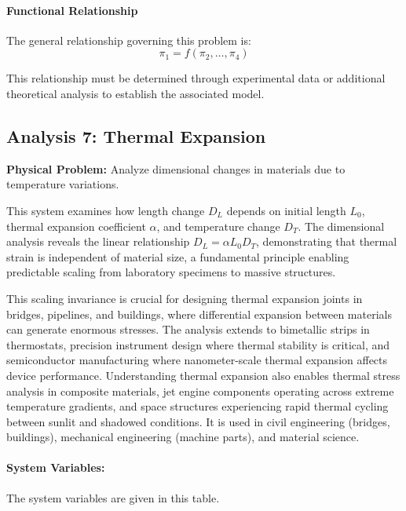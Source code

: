                     \paragraph{Functional Relationship}
                    The general relationship governing this problem is:
                    \begin{equation}
                    \pi_1 = f(\pi_2, \ldots, \pi_{4})
                    \end{equation}

                    This relationship must be determined through experimental data or additional theoretical analysis to establish the associated model.


\subsection{Analysis 7: Thermal Expansion}
\label{sec:Thermal_Expansion}

\begin{problembox}
\textbf{Physical Problem:} Analyze dimensional changes in materials due to temperature variations.
\end{problembox}

This system examines how length change $D_L$ depends on initial length $L_0$, thermal expansion coefficient $\alpha$, and temperature change $D_T$. The dimensional analysis reveals the linear relationship $D_L = \alpha L_0 D_T$, demonstrating that thermal strain is independent of material size, a fundamental principle enabling predictable scaling from laboratory specimens to massive structures.



This scaling invariance is crucial for designing thermal expansion joints in bridges, pipelines, and buildings, where differential expansion between materials can generate enormous stresses. The analysis extends to bimetallic strips in thermostats, precision instrument design where thermal stability is critical, and semiconductor manufacturing where nanometer-scale thermal expansion affects device performance. Understanding thermal expansion also enables thermal stress analysis in composite materials, jet engine components operating across extreme temperature gradients, and space structures experiencing rapid thermal cycling between sunlit and shadowed conditions. It is used in civil engineering (bridges, buildings), mechanical engineering (machine parts), and material science.

\paragraph{System Variables: } The system variables are given in this table.

